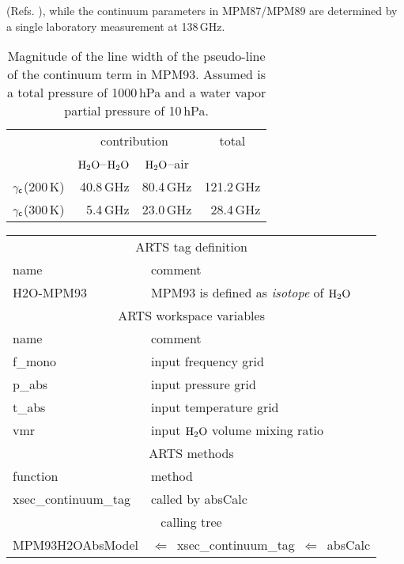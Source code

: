 (Refs. \cite{beckerautler:46,godonetal:92}), while the continuum 
parameters in MPM87/MPM89 are determined by a single laboratory 
measurement at 138\,GHz.
%
\begin{table}[!htb]
\begin{center}
\begin{tabular}{lrrr}
\hline
 & \multicolumn{2}{c}{contribution} & \multicolumn{1}{c}{total} \\
 & \multicolumn{1}{c}{$\mbox{H}_2\mbox{O}$--$\mbox{H}_2\mbox{O}$} & \multicolumn{1}{c}{$\mbox{H}_2\mbox{O}$--air} & \\
\hline
$\gamma_{\sf c}$(200\,K) & 40.8\,GHz & 80.4\,GHz & 121.2\,GHz\\
$\gamma_{\sf c}$(300\,K) &  5.4\,GHz & 23.0\,GHz &  28.4\,GHz\\
\hline
\end{tabular}
\caption{Magnitude of the line width of the pseudo-line of the
  continuum term in MPM93. Assumed is a total pressure of 1000\,hPa
  and a water vapor partial pressure of 10\,hPa.}
\label{tab:mpm_psl_broad}
\end{center}
\end{table} 
%
%
\begin{center}
\begin{tabular}{ll}
\hline
\multicolumn{2}{c}{ARTS tag definition}\\
name      & comment \\
H2O-MPM93 & MPM93 is defined as {\it isotope} of $\mbox{H}_2\mbox{O}$\\
\hline
\multicolumn{2}{c}{ARTS workspace variables}\\
name & comment \\
 f\_mono & input frequency grid \\
 p\_abs  & input pressure grid \\
 t\_abs  & input temperature grid\\
 vmr    & input $\mbox{H}_2\mbox{O}$ volume mixing ratio\\
\hline
\multicolumn{2}{c}{ARTS methods}\\
function           & method\\
xsec\_continuum\_tag & called by absCalc \\
\hline
\multicolumn{2}{c}{calling tree}\\
MPM93H2OAbsModel & $\Leftarrow$~xsec\_continuum\_tag~$\Leftarrow$~absCalc\\
\end{tabular}
\end{center}

